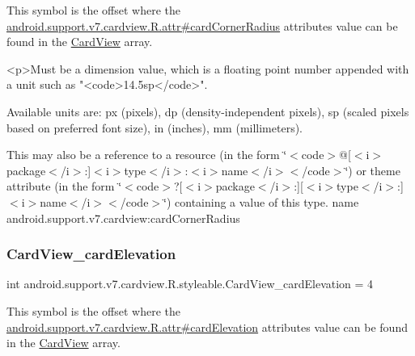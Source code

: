 This symbol is the offset where the \hyperlink{classandroid_1_1support_1_1v7_1_1cardview_1_1R_1_1attr_a6d39a018270a4e6fe065c3ba400817ad}{android.\+support.\+v7.\+cardview.\+R.\+attr\#card\+Corner\+Radius} attribute\textquotesingle{}s value can be found in the \hyperlink{classandroid_1_1support_1_1v7_1_1cardview_1_1R_1_1styleable_ad08b98a07471f174f404c58941fc82ca}{Card\+View} array.

\begin{DoxyVerb}      <p>Must be a dimension value, which is a floating point number appended with a unit such as "<code>14.5sp</code>".
\end{DoxyVerb}
 Available units are\+: px (pixels), dp (density-\/independent pixels), sp (scaled pixels based on preferred font size), in (inches), mm (millimeters). 

This may also be a reference to a resource (in the form \char`\"{}$<$code$>$@\mbox{[}$<$i$>$package$<$/i$>$\+:\mbox{]}$<$i$>$type$<$/i$>$\+:$<$i$>$name$<$/i$>$$<$/code$>$\char`\"{}) or theme attribute (in the form \char`\"{}$<$code$>$?\mbox{[}$<$i$>$package$<$/i$>$\+:\mbox{]}\mbox{[}$<$i$>$type$<$/i$>$\+:\mbox{]}$<$i$>$name$<$/i$>$$<$/code$>$\char`\"{}) containing a value of this type.  name android.\+support.\+v7.\+cardview\+:card\+Corner\+Radius \mbox{\label{classandroid_1_1support_1_1v7_1_1cardview_1_1R_1_1styleable_a722e279b5228de84f205a2cff6f3fea5}} 
\subsubsection{\texorpdfstring{Card\+View\+\_\+card\+Elevation}{CardView\_cardElevation}}
{\footnotesize\ttfamily int android.\+support.\+v7.\+cardview.\+R.\+styleable.\+Card\+View\+\_\+card\+Elevation = 4\hspace{0.3cm}{\ttfamily [static]}}

This symbol is the offset where the \hyperlink{classandroid_1_1support_1_1v7_1_1cardview_1_1R_1_1attr_aee945e311bc98e30cd1e2812a35a3d55}{android.\+support.\+v7.\+cardview.\+R.\+attr\#card\+Elevation} attribute\textquotesingle{}s value can be found in the \hyperlink{classandroid_1_1support_1_1v7_1_1cardview_1_1R_1_1styleable_ad08b98a07471f174f404c58941fc82ca}{Card\+View} array.

